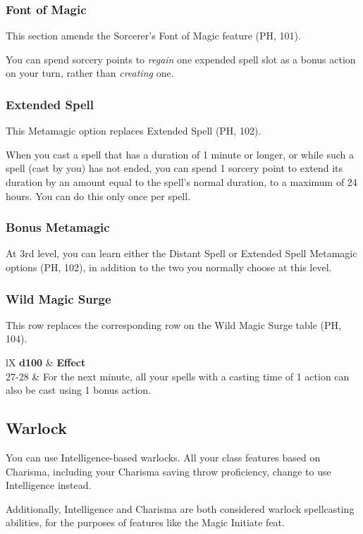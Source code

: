 \documentclass[letterpaper,twocolumn,openany,nodeprecatedcode]{dndbook}
\begin{document}
\subsubsection{Font of Magic}
This section amends the Sorcerer's Font of Magic feature (PH, 101).

You can spend sorcery points to \textit{regain} one expended spell slot as a bonus action on your turn, rather than \textit{creating} one.

\subsubsection{Extended Spell}
This Metamagic option replaces Extended Spell (PH, 102).

When you cast a spell that has a duration of 1 minute or longer, or while such a spell (cast by you) has not ended, you can spend 1 sorcery point to extend its duration by an amount equal to the spell's normal duration, to a maximum of 24 hours. You can do this only once per spell.

\subsubsection{Bonus Metamagic}
At 3rd level, you can learn either the Distant Spell or Extended Spell Metamagic options (PH, 102), in addition to the two you normally choose at this level.

\subsubsection{Wild Magic Surge}
This row replaces the corresponding row on the Wild Magic Surge table (PH, 104).

\begin{DndTable}[]{lX}
    \textbf{d100} & \textbf{Effect} \\
    27-28 & For the next minute, all your spells with a casting time of 1 action can also be cast using 1 bonus action.
\end{DndTable}

\subsection{Warlock}

You can use Intelligence-based warlocks. All your class features based on Charisma, including your Charisma saving throw proficiency, change to use Intelligence instead.

Additionally, Intelligence and Charisma are both considered warlock spellcasting abilities, for the purposes of features like the Magic Initiate feat.
\end{document}
